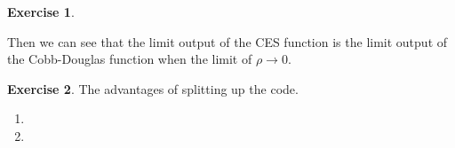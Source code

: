 \documentclass[11pt,a4paper,leqno]{article}
\theoremstyle{definition}
\newtheorem{exercise}{Exercise}
\begin{document}
\begin{exercise}
\begin{enumerate}
        Then we can see that the limit output of the CES function is the limit output of the Cobb-Douglas function when the limit of $\rho \rightarrow 0$.

    \end{enumerate}
\end{exercise}


\begin{exercise}
    The advantages of splitting up the code.  
    \begin{enumerate}
        \item 
        \item      
    \end{enumerate}
\end{exercise}


\end{document}
